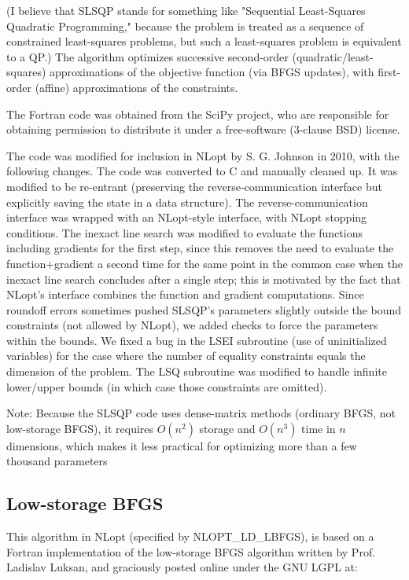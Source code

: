 \cite{Kraft_1988, Kraft_1994}

(I believe that SLSQP stands for something like "Sequential Least-Squares Quadratic Programming," because the problem is treated as a sequence of constrained least-squares problems, but such a least-squares problem is equivalent to a QP.) The algorithm optimizes successive second-order (quadratic/least-squares) approximations of the objective function (via BFGS updates), with first-order (affine) approximations of the constraints. 

The Fortran code was obtained from the SciPy project, who are responsible for obtaining permission to distribute it under a free-software (3-clause BSD) license. 

The code was modified for inclusion in NLopt by S. G. Johnson in 2010, with the following changes. The code was converted to C and manually cleaned up. It was modified to be re-entrant (preserving the reverse-communication interface but explicitly saving the state in a data structure). The reverse-communication interface was wrapped with an NLopt-style interface, with NLopt stopping conditions. The inexact line search was modified to evaluate the functions including gradients for the first step, since this removes the need to evaluate the function+gradient a second time for the same point in the common case when the inexact line search concludes after a single step; this is motivated by the fact that NLopt's interface combines the function and gradient computations. Since roundoff errors sometimes pushed SLSQP's parameters slightly outside the bound constraints (not allowed by NLopt), we added checks to force the parameters within the bounds. We fixed a bug in the LSEI subroutine (use of uninitialized variables) for the case where the number of equality constraints equals the dimension of the problem. The LSQ subroutine was modified to handle infinite lower/upper bounds (in which case those constraints are omitted). 

Note: Because the SLSQP code uses dense-matrix methods (ordinary BFGS, not low-storage BFGS), it requires $O(n^2)$ storage and $O(n^3)$ time in $n$ dimensions, which makes it less practical for optimizing more than a few thousand parameters



\subsection{Low-storage BFGS}
This algorithm in NLopt (specified by NLOPT\_LD\_LBFGS), is based on a Fortran implementation of the low-storage BFGS algorithm written by Prof. Ladislav Luksan, and graciously posted online under the GNU LGPL at: 

